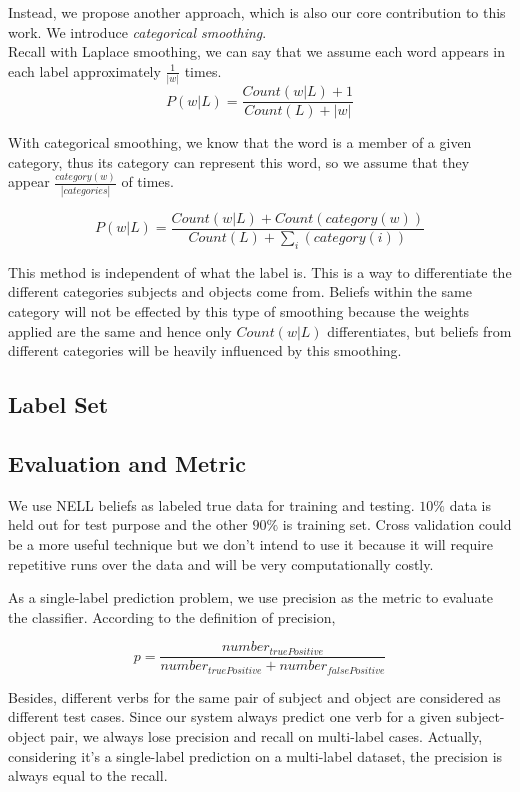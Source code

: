 Instead, we propose another approach, which is also our core contribution to this work. We introduce \emph{categorical smoothing}.\\

Recall with Laplace smoothing, we can say that we assume each word appears in each label approximately $\frac{1}{|w|}$ times.\\

\begin{equation}
	P(w|L) = \frac{Count(w|L)+1}{Count(L)+|w|}
\end{equation}

With categorical smoothing, we know that the word is a member of a given category, thus its category can represent this word, so we assume that they appear $\frac{category(w)}{|categories|}$ of times. 

\begin{equation}
	P(w|L) = \frac{Count(w|L)+Count(category(w))}{Count(L)+\sum_i(category(i))}
\end{equation}

This method is independent of what the label is. This is a way to differentiate the different categories subjects and objects come from. Beliefs within the same category will not be effected by this type of smoothing because the weights applied are the same and hence only $Count(w|L)$ differentiates, but beliefs from different categories will be heavily influenced by this smoothing.

\subsection{Label Set}


\subsection{Evaluation and Metric}

We use NELL beliefs as labeled true data for training and testing. $10\%$ data is held out for test purpose and the other $90\%$ is training set. Cross validation could be a more useful technique but we don't intend to use it because it will require repetitive runs over the data and will be very computationally costly.

As a single-label prediction problem, we use precision as the metric to evaluate the classifier. According to the definition of precision,

\begin{equation}
	p = \frac{number_{truePositive}}{number_{truePositive} + number_{falsePositive}}
\end{equation}

Besides, different verbs for the same pair of subject and object are considered as different test cases. Since our system always predict one verb for a given subject-object pair, we always lose precision and recall on multi-label cases. Actually, considering it's a single-label prediction on a multi-label dataset, the precision is always equal to the recall.




